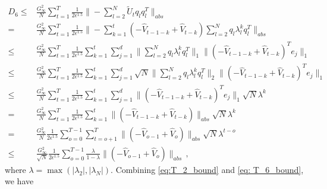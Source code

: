 \documentclass{article} %
\begin{document}
\begin{equation}\label{eq: T_6_bound}
\begin{split}
D_6 \leq & \frac{G_{\infty}^2}{N}\sum_{t=1}^T \frac{1}{2\epsilon^{1.5}}  \| - \sum_{l=2}^N  \tilde U_t q_l q_l^T \|_{abs}  \\
=  & \frac{G_{\infty}^2}{N}\sum_{t=1}^T \frac{1}{2\epsilon^{1.5}}  \| -   \sum_{k=1}^t (- \hat V_{t-1-k} + \hat V_{t-k} )  \sum_{l=2}^N q_l \lambda_l^k q_l^T \|_{abs}  \\ 
\leq &  \frac{G_{\infty}^2}{N}\sum_{t=1}^T \frac{1}{2\epsilon^{1.5}}  \sum_{k=1}^t  \sum_{j=1}^d \| \sum_{l=2}^N q_l \lambda_l^k q_l^T \|_{1}  \|     (- \hat V_{t-1-k} + \hat V_{t-k} )^T e_j \|_1   \\
\leq &  \frac{G_{\infty}^2}{N}\sum_{t=1}^T \frac{1}{2\epsilon^{1.5}}  \sum_{k=1}^t  \sum_{j=1}^d  \sqrt{N}\| \sum_{l=2}^N q_l \lambda_l^k q_l^T \|_{2}  \|     (- \hat V_{t-1-k} + \hat V_{t-k} )^T e_j \|_1   \\
\leq  & \frac{G_{\infty}^2}{N}\sum_{t=1}^T \frac{1}{2\epsilon^{1.5}}  \sum_{k=1}^t \sum_{j=1}^d \|    (- \hat V_{t-1-k} + \hat V_{t-k} )^T e_j\|_1 \sqrt{N} \lambda^k  \\
=  & \frac{G_{\infty}^2}{N}\sum_{t=1}^T \frac{1}{2\epsilon^{1.5}}  \sum_{k=1}^t  \|    (- \hat V_{t-1-k} + \hat V_{t-k} ) \|_{abs} \sqrt{N} \lambda^k  \\
=  & \frac{G_{\infty}^2}{N}\frac{1}{2\epsilon^{1.5}} \sum_{o=0}^{T-1} \sum_{t=o+1}^T     \|    (- \hat V_{o-1} + \hat V_{o} ) \|_{abs} \sqrt{N} \lambda^{t-o}  \\ 
\leq & \frac{G_{\infty}^2}{\sqrt{N}}\frac{1}{2\epsilon^{1.5}} \sum_{o=0}^{T-1} \frac{\lambda}{1-\lambda}     \|    (- \hat V_{o-1} + \hat V_{o} ) \|_{abs} \, ,
\end{split}
\end{equation}
where $\lambda = \max (|\lambda_2|,|\lambda_N|)$.
Combining \eqref{eq:T_2_bound} and \eqref{eq: T_6_bound}, we have
\end{document}

